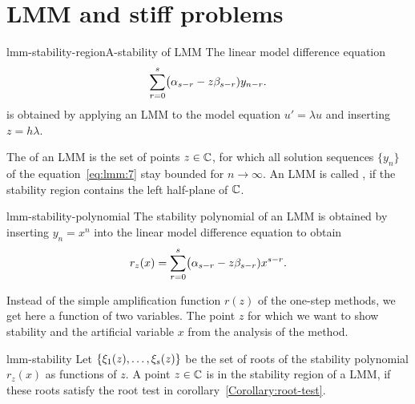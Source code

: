 \section{LMM and stiff problems}

\begin{Definition*}{lmm-stability-region}{A-stability of LMM}
  The linear model difference equation
  \begin{gather}
    \label{eq:lmm:7}
    \sum_{r=0}^{s} \bigl(\alpha_{s-r} - z \beta_{s-r}) y_{n-r}.
  \end{gather}
  is obtained by applying an LMM to the model equation
  $u' = \lambda u$ and inserting $z=h\lambda$.

  The  of an LMM is the set of points $z\in \mathbb C$,
  for which all solution sequences $\{y_n\}$ of the equation~\eqref{eq:lmm:7}
  stay bounded for $n\to\infty$. An LMM is called , if the 
  stability region contains the left half-plane of $\mathbb C$.
\end{Definition*}


\begin{Definition}{lmm-stability-polynomial}
  The stability polynomial of an LMM is obtained by inserting
  $y_n = x^n$ into the linear model difference equation to obtain
  \begin{gather}
    \label{eq:lmm:8}
    r_z(x) = \sum_{r=0}^{s} \bigl(\alpha_{s-r} - z \beta_{s-r})
    x^{s-r}.
  \end{gather}
\end{Definition}

\begin{remark}
  Instead of the simple amplification function $r(z)$ of the one-step
  methods, we get here a function of two variables.  The point $z$ for
  which we want to show stability and the artificial variable $x$ from
  the analysis of the method.
\end{remark}

\begin{Lemma}{lmm-stability}
  Let $\{\xi_1(z),\dots,\xi_s(z)\}$ be the set of roots of the
  stability polynomial $r_z(x)$ as functions of $z$.
  A point $z\in \mathbb C$ is in the stability region of a LMM, if these
  roots satisfy the root test in corollary~\ref{Corollary:root-test}.
\end{Lemma}

